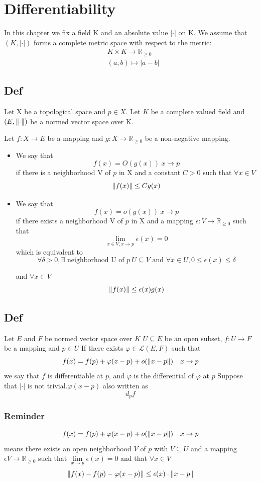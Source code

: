 \documentclass{book}
\newcommand{\abs}[1]{\left\lvert #1 \right\rvert}
\begin{document}
\chapter{Differentiability}
In this chapter we fix a field K and an absolute value $\lvert\cdot\rvert$ on K.
We assume that $(K,\lvert\cdot\rvert)$ forms a complete metric space with respect to the metric:$$\begin{aligned}
    &K\times K\rightarrow\mathbb{R}_{\geq 0}\\
    &(a,b)\mapsto\lvert a-b\rvert
\end{aligned}$$
\section{Def}
Let X be a topological space and $p\in X$. Let $K$ be a complete valued field and $(E,\left\lVert \cdot \right\rVert)$ be a normed vector space over K.

Let $f:X\rightarrow E$ be a mapping  and $g:X\rightarrow \mathbb{R}_{\geq0}$ be a non-negative mapping.
\begin{itemize}
    \item We say that $$f(x)=O(g(x))\ x\rightarrow p$$ if there is a neighborhood V of $p$ in X and a constant $C>0$ such that $\forall x\in V$$$\left\lVert f(x) \right\rVert\leq Cg(x)$$
    \item We say that $$f(x)=o(g(x))\ x\rightarrow p$$ if there exists a neighborhood V of $p$ in X and a mapping $\epsilon:V\rightarrow\mathbb{R}_{\geq 0}$ such that 
    $$\lim\limits_{x\in V,x\rightarrow p}\epsilon(x)=0$$
    which is equivalent to $$\forall \delta>0,\exists\text{ neighborhood U of }p\ U\subseteq V \text{ and } \forall x\in U,0\leq\epsilon(x)\leq\delta$$
    
    and $\forall x\in V$$$\left\lVert f(x) \right\rVert\leq \epsilon(x)g(x)$$
\end{itemize}
\section{Def}
Let $E$ and $F$ be normed vector space over $K$ $U\subseteq E$ be an open subset, $f:U\rightarrow F$ be a mapping and $p\in U$ If there exists $\varphi\in\mathscr{L}(E,F)$ such that 
$$f(x)=f(p)+\varphi(x-p)+o(\left\lVert x-p \right\rVert)\quad {x\rightarrow p}$$ 
we say that $f$ is differentiable at $p$, and $\varphi$ is the differential of $\varphi$ at $p$
Suppose that $\abs{\cdot}$ is not trivial.$\varphi(x-p)$ also written as $$d_pf$$
\subsection*{Reminder}
$$f(x)=f(p)+\varphi(x-p)+o(\left\lVert x-p \right\rVert)\quad {x\rightarrow p}$$ 
means there exists an open neighborhood $V$ of $p$ with $V\subseteq U$ and a mapping $\epsilon V\rightarrow\mathbb{R}_{\geq0}$ such that $\lim\limits_{x\rightarrow p}\epsilon(x)=0$ and that $\forall x\in V$
$$\left\lVert f(x)-f(p)-\varphi(x-p) \right\rVert\leq\epsilon(x)\cdot\left\lVert x-p \right\rVert$$
\end{document}
